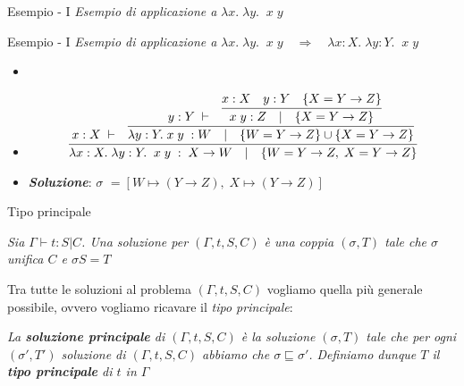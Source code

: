 \documentclass{beamer}
\begin{document}

\begin{tframe}{Esempio - I}
\emph{Esempio di applicazione a } $\lambda x.\; \lambda y. \; \; x \; y $
\end{tframe}

\begin{tframe}{Esempio - I}
\emph{Esempio di applicazione a } $\lambda x.\; \lambda y. \; \; x \; y \quad \Rightarrow \quad \lambda x : X.\; \lambda y : Y. \; \; x \; y$
\begin{itemize}
\item<1->[]
\item<2->[]
\vspace{-0.6cm}
\begin{displaymath}
\infer{\lambda x : X.\; \lambda y : Y. \; \; x \; y \; : \; X \rightarrow W \quad | \quad \{ W = Y \rightarrow Z,\; X = Y \rightarrow Z \} }{x : X \; \vdash & \infer{\lambda y : Y. \; x \; y \; : W \quad | \quad \{ W = Y \rightarrow Z\} \cup \{X = Y \rightarrow Z \}}{y : Y \; \vdash & \infer{x \; y : Z \quad | \quad \{ X = Y \rightarrow Z \}}{x : X & y : Y & \{ X = Y \rightarrow Z \}}}}
\end{displaymath}
\item<3->[]\vspace{0.8cm}\textbf{\emph{Soluzione}}: \textbf{$\sigma$} $= [W \mapsto (Y \rightarrow Z), \; X \mapsto (Y \rightarrow Z)]$
\end{itemize}
\end{tframe}


\begin{tframe}{Tipo principale}
\begin{definition}[]
\textit{Sia $\Gamma \vdash t : S | C$. Una soluzione per $(\Gamma, t, S, C)$ è una coppia $(\sigma, T)$ tale che $\sigma$ unifica $C$ e $\sigma S = T$}
\end{definition}

\vspace{0.3cm}

Tra tutte le soluzioni al problema $(\Gamma, t, S, C)$ vogliamo quella più generale possibile, ovvero vogliamo ricavare il \emph{tipo principale}:

\vspace{0.3cm}

\begin{definition}
\textit{La \textbf{soluzione principale} di $(\Gamma, t, S, C)$ è la soluzione $(\sigma, T)$ tale che per ogni $(\sigma', T')$ soluzione di $(\Gamma, t, S, C)$ abbiamo che $\sigma \sqsubseteq \sigma'$. Definiamo dunque $T$ il \textbf{tipo principale} di $t$ in $\Gamma$}
\end{definition}
\end{tframe}
\end{document}
